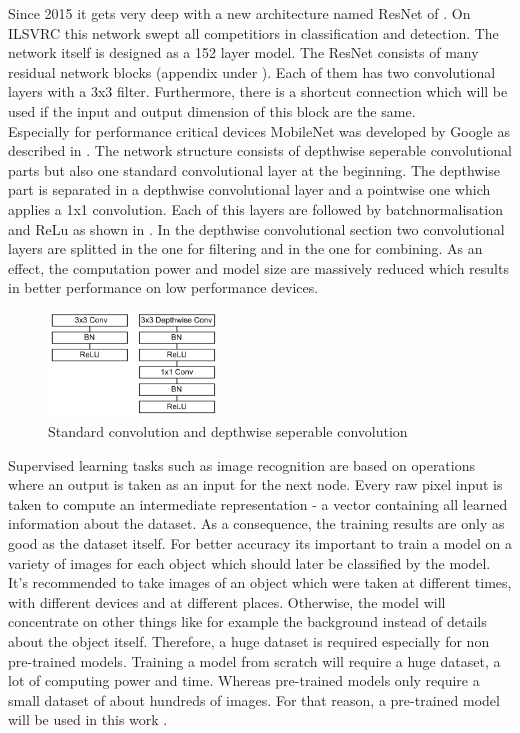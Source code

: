 Since 2015 it gets very deep with a new architecture named ResNet of \citet{HE2015}. On ILSVRC this network swept all competitiors in classification and detection. The network itself is designed as a 152 layer model. The ResNet consists of many residual network blocks (appendix under ). Each of them has two convolutional layers with a 3x3 filter. Furthermore, there is a shortcut connection which will be used if the input and output dimension of this block are the same. \\


Especially for performance critical devices MobileNet was developed by Google as described in \citet{Howard2017}.
The network structure consists of depthwise seperable convolutional parts but also one standard convolutional layer at the beginning. The depthwise part is separated in a depthwise convolutional layer and a pointwise one which applies a 1x1 convolution. Each of this layers are followed by batchnormalisation and ReLu as shown in . In the depthwise convolutional section two convolutional layers are splitted in the one for filtering and in the one for combining. As an effect, the computation power and model size are massively reduced which results in better performance on low performance devices.

\begin{figure}[htbp]
\centering
\includegraphics[width=0.4\textwidth]{includes/MobileNetArch}
\caption[Standard convolution and depthwise seperable convolution]{Standard convolution and depthwise seperable convolution \citep[p. 4]{Howard2017}}
\label{fig:FH-Logo7}
\end{figure}
 		
Supervised learning tasks such as image recognition are based on operations where an output is taken as an input for the next node. Every raw pixel input is taken to compute an intermediate representation - a vector containing all learned information about the dataset. As a consequence, the training results are only as good as the dataset itself. For better accuracy its important to train a model on a variety of images for each object which should later be classified by the model. It's recommended to take images of an object which were taken at different times, with different devices and at different places. Otherwise, the model will concentrate on other things like for example the background instead of details about the object itself. Therefore, a huge dataset is required especially for non pre-trained models. Training a model from scratch will require a huge dataset, a lot of computing power and time. Whereas pre-trained models only require a small dataset of about hundreds of images. For that reason, a pre-trained model will be used in this work \citep{TensorFlowRetrain2017}.